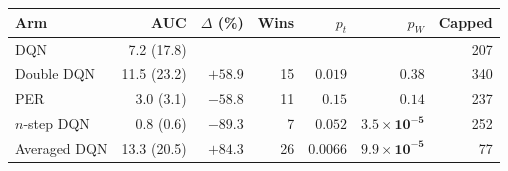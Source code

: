 \begin{tabular}{@{}lrrrrrr@{}}
\toprule
Arm & AUC & $\Delta$ (\%) & Wins & $p_t$ & $p_W$ & Capped \\
\midrule
DQN & 7.2 (17.8) & & & & & 207 \\
Double DQN & 11.5 (23.2) & $+58.9$ & 15 & $0.019$ & $0.38$ & 340 \\
PER & 3.0 (3.1) & $-58.8$ & 11 & $0.15$ & $0.14$ & 237 \\
$n$-step DQN & 0.8 (0.6) & $-89.3$ & 7 & $0.052$ & $\mathbf{3.5\times10^{-5}}$ & 252 \\
Averaged DQN & 13.3 (20.5) & $+84.3$ & 26 & $\mathbf{0.0066}$ & $\mathbf{9.9\times10^{-5}}$ & 77 \\
\bottomrule
\end{tabular}
